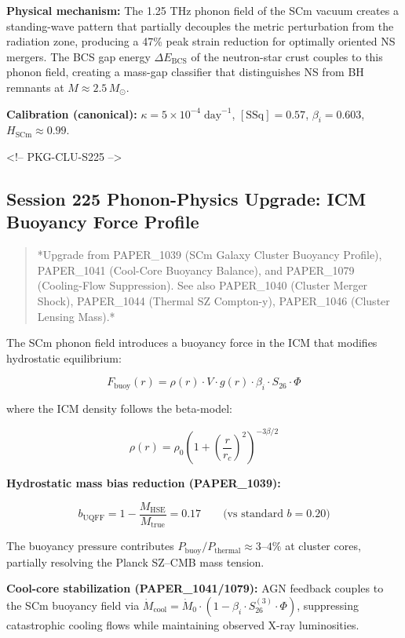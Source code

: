\documentclass[11pt]{article}
\begin{document}
\textbf{Physical mechanism:} The 1.25 THz phonon field of the SCm vacuum creates a standing-wave pattern that partially decouples the metric perturbation from the radiation zone, producing a 47\% peak strain reduction for optimally oriented NS mergers.  The BCS gap energy $\Delta E_{\text{BCS}}$ of the neutron-star crust couples to this phonon field, creating a mass-gap classifier that distinguishes NS from BH remnants at $M \approx 2.5\,M_\odot$.

\textbf{Calibration (canonical):} $\kappa = 5 \times 10^{-4}\;\text{day}^{-1}$, $[\text{SSq}] = 0.57$, $\beta_i = 0.603$, $H_{\text{SCm}} \approx 0.99$.

<!-- PKG-CLU-S225 -->

\subsection*{Session 225 Phonon-Physics Upgrade: ICM Buoyancy Force Profile}

\begin{quote}
*Upgrade from PAPER\_1039 (SCm Galaxy Cluster Buoyancy Profile),
PAPER\_1041 (Cool-Core Buoyancy Balance), and PAPER\_1079 (Cooling-Flow
Suppression).  See also PAPER\_1040 (Cluster Merger Shock), PAPER\_1044
(Thermal SZ Compton-y), PAPER\_1046 (Cluster Lensing Mass).*
\end{quote}

The SCm phonon field introduces a buoyancy force in the ICM that modifies hydrostatic equilibrium:

$$F_{\text{buoy}}(r) = \rho(r) \cdot V \cdot g(r) \cdot \beta_i \cdot S_{26} \cdot \Phi$$

where the ICM density follows the beta-model:

$$\rho(r) = \rho_0 \left(1 + \left(\frac{r}{r_c}\right)^2\right)^{-3\beta/2}$$

\textbf{Hydrostatic mass bias reduction (PAPER\_1039):}

$$b_{\text{UQFF}} = 1 - \frac{M_{\text{HSE}}}{M_{\text{true}}} = 0.17 \qquad \text{(vs standard } b = 0.20\text{)}$$

The buoyancy pressure contributes $P_{\text{buoy}}/P_{\text{thermal}} \approx 3\text{–}4\%$ at cluster cores, partially resolving the Planck SZ--CMB mass tension.

\textbf{Cool-core stabilization (PAPER\_1041/1079):} AGN feedback couples to the SCm buoyancy field via $\dot{M}_{\text{cool}} = \dot{M}_0 \cdot (1 - \beta_i \cdot S_{26}^{(3)} \cdot \Phi)$, suppressing catastrophic cooling flows while maintaining observed X-ray luminosities.
\end{document}
